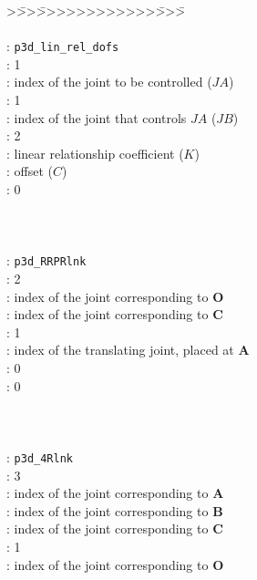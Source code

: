\begin{tabbing}
>\=>>\=>>>>>>>>>>>>\=>>>\= \kill
{} \\
\>\>\\
\> \>: {\tt p3d\_lin\_rel\_dofs}\\
\> \>: 1\\
\> \>: index of the joint to be controlled ($JA$)\\
\> \>: 1\\
\> \>: index of the joint that controls $JA$ ($JB$)\\
\> \>: 2\\
\> \>: linear relationship coefficient ($K$)\\
\> \>: offset ($C$)\\
\> \>: 0\\
\>\>\\
 \\
\>\>\\
\> \>: {\tt p3d\_RRPRlnk}\\
\> \>: 2\\
\> \>: index of the joint corresponding to {\bf O}\\
\> \>: index of the joint corresponding to {\bf C}\\
\> \>: 1\\
\> \>: index of the translating joint, placed at {\bf A}\\
\> \>: 0\\
\> \>: 0\\
\>\>\\
 \\
\>\>\\
\> \>: {\tt p3d\_4Rlnk}\\
\> \>: 3\\
\> \>: index of the joint corresponding to {\bf A}\\
\> \>: index of the joint corresponding to {\bf B}\\
\> \>: index of the joint corresponding to {\bf C}\\
\> \>: 1\\
\> \>: index of the joint corresponding to {\bf O}\\

\end{tabbing}
